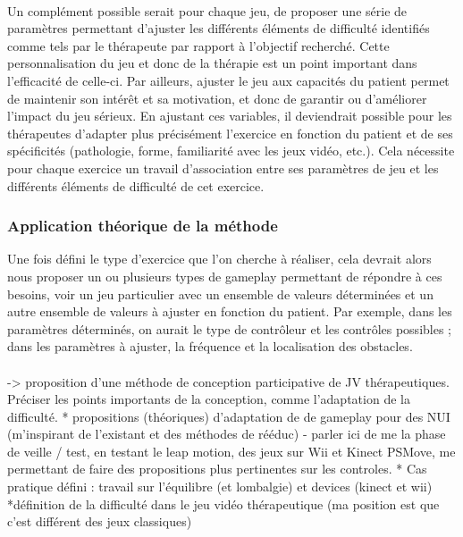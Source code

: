 \paragraph{}Un complément possible serait pour chaque jeu, de proposer une série de paramètres permettant d’ajuster les différents éléments de difficulté identifiés comme tels par le thérapeute par rapport à l’objectif recherché. Cette personnalisation du jeu et donc de la thérapie est un point important dans l’efficacité de celle-ci. Par ailleurs, ajuster le jeu aux capacités du patient permet de maintenir son intérêt et sa motivation, et donc de garantir ou d’améliorer l’impact du jeu sérieux. En ajustant ces variables, il deviendrait possible pour les thérapeutes d’adapter plus précisément l’exercice en fonction du patient et de ses spécificités (pathologie, forme, familiarité avec les jeux vidéo, etc.). Cela nécessite pour chaque exercice un travail d’association entre ses paramètres de jeu et les différents éléments de difficulté de cet exercice.

	\subsubsection*{Application théorique de la méthode}
Une fois défini le type d'exercice que l’on cherche à réaliser, cela devrait alors nous proposer un ou plusieurs types de gameplay permettant de répondre à ces besoins, voir un jeu particulier avec un ensemble de valeurs déterminées et un autre ensemble de valeurs à ajuster en fonction du patient. Par exemple, dans les paramètres déterminés, on aurait le type de contrôleur et les contrôles possibles ; dans les paramètres à ajuster, la fréquence et la localisation des obstacles.

\paragraph{}
-> proposition d'une méthode de conception participative de JV thérapeutiques. Préciser les points importants de la conception, comme l'adaptation de la difficulté.
* propositions (théoriques) d'adaptation de de gameplay pour des NUI (m'inspirant de l'existant et des méthodes de rééduc)
	- parler ici de me la phase de veille / test, en testant le leap motion, des jeux sur Wii et Kinect PSMove, me permettant de faire des propositions plus pertinentes sur les controles.
* Cas pratique défini : travail sur l'équilibre (et lombalgie) et devices (kinect et wii)
*définition de la difficulté dans le jeu vidéo thérapeutique (ma position est que c'est différent des jeux classiques)